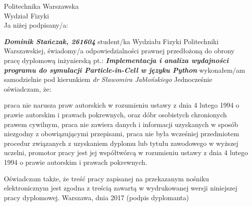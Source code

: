 \setcounter{page}{7}
\vspace{-1.5cm}
\begin{flushleft}
	Politechnika Warszawska \\
	Wydział Fizyki \\
	\vspace{0.5cm}
	Ja niżej podpisany/a:
\end{flushleft}
\center \textit{\textbf{Dominik Stańczak, 261604}} %
\justify student/ka Wydziału Fizyki Politechniki Warszawskiej, świadomy/a odpowiedzialności prawnej przedłożoną do obrony pracę dyplomową inżynierską pt.:
\center \textit{\textbf{Implementacja i analiza wydajności programu do symulacji Particle-in-Cell w języku Python}} %
\justify wykonałem/am samodzielnie pod kierunkiem
\center \textit{dr Sławomira Jabłońskiego} %
\justify Jednocześnie oświadczam, że: \\
\begin{itemize}
	\itemi praca nie narusza praw autorskich w rozumieniu ustawy z dnia 4 lutego 1994 o prawie autorskim i prawach pokrewnych, oraz dóbr osobistych chronionych prawem cywilnym,
	\itemi praca nie zawiera danych i informacji uzyskanych w sposób niezgodny z obowiązującymi przepisami,
	\itemi praca nie była wcześniej przedmiotem procedur związanych z uzyskaniem dyplomu lub tytułu zawodowego w wyższej uczelni,
	\itemi promotor pracy jest jej współtwórcą w rozumieniu ustawy z dnia 4 lutego 1994 o prawie autorskim i prawach pokrewnych.
\end{itemize}
\justify Oświadczam także, że treść pracy zapisanej na przekazanym nośniku elektronicznym jest zgodna z treścią zawartą w wydrukowanej wersji niniejszej pracy dyplomowej.
\vfill
Warszawa, dnia 2017 \hfill (podpis dyplomanta) %

\newpage
\thispagestyle{empty}
\phantom{Nothing here}
\newpage
\clearpage
\phantom{Here neither}

